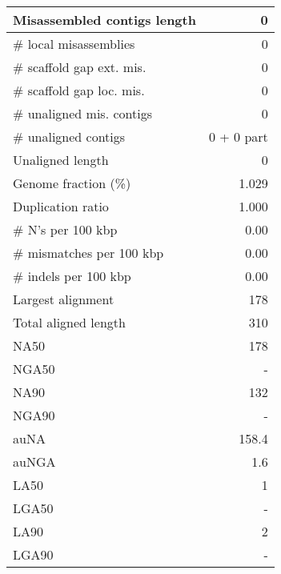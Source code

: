 \documentclass[12pt,a4paper]{article}
\begin{document}
\begin{table}[ht]
\begin{center}
\begin{tabular}{|l*{1}{|r}|}
Misassembled contigs length & 0 \\ \hline
\# local misassemblies & 0 \\ \hline
\# scaffold gap ext. mis. & 0 \\ \hline
\# scaffold gap loc. mis. & 0 \\ \hline
\# unaligned mis. contigs & 0 \\ \hline
\# unaligned contigs & 0 + 0 part \\ \hline
Unaligned length & 0 \\ \hline
Genome fraction (\%) & 1.029 \\ \hline
Duplication ratio & 1.000 \\ \hline
\# N's per 100 kbp & 0.00 \\ \hline
\# mismatches per 100 kbp & 0.00 \\ \hline
\# indels per 100 kbp & 0.00 \\ \hline
Largest alignment & 178 \\ \hline
Total aligned length & 310 \\ \hline
NA50 & 178 \\ \hline
NGA50 & - \\ \hline
NA90 & 132 \\ \hline
NGA90 & - \\ \hline
auNA & 158.4 \\ \hline
auNGA & 1.6 \\ \hline
LA50 & 1 \\ \hline
LGA50 & - \\ \hline
LA90 & 2 \\ \hline
LGA90 & - \\ \hline
\end{tabular}
\end{center}
\end{table}
\end{document}
